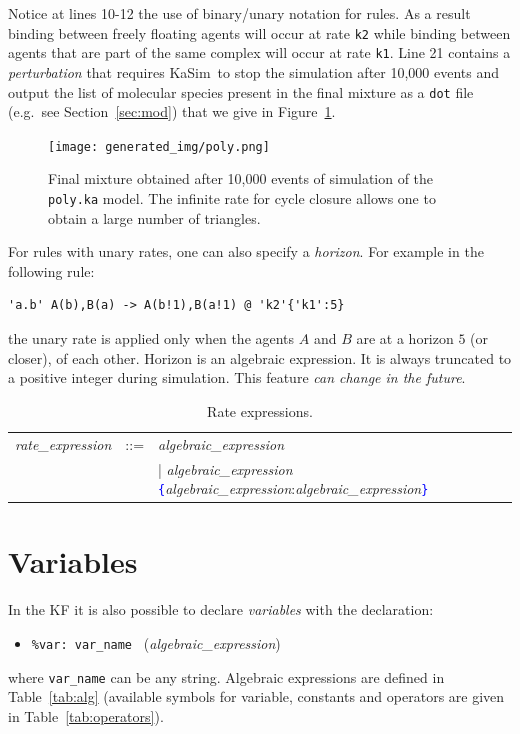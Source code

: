 \documentclass[11pt]{book}
\def\KaSim{\textsf{KaSim}}
\def\tcb#1{\textcolor{blue}{\ttt{#1}}}
\def\ttt#1{\texttt{#1}}
\def\var#1{{\textquotesingle}#1{\textquotesingle}}
\def\eg{e.g.~}
\def\ITE#1{\begin{itemize}#1\end{itemize}}
\begin{document}
Notice at lines 10-12 the use of binary/unary notation for rules. As a
result binding between freely floating agents will occur at rate
\ttt{{\textquotesingle}k2{\textquotesingle}} while binding between
agents that are part of the same complex will occur at rate
\ttt{{\textquotesingle}k1{\textquotesingle}}. Line 21 contains a
\emph{perturbation} that requires \KaSim~to stop the simulation after
10,000 events and output the list of molecular species present in the
final mixture as a \texttt{dot} file ({\eg}see Section~\ref{sec:mod})
that we give in Figure~\ref{fig:species}.

\begin{figure}[htbp]
\begin{center}
\texttt{[image: generated\_img/poly.png]}
\caption{Final mixture %
   obtained after 10,000 events of simulation of the \ttt{poly.ka} model. The infinite rate for cycle closure allows one to obtain a large number of triangles.}
\label{fig:species}
\end{center}
\end{figure}

For rules with unary rates, one can also specify a \emph{horizon}.
For example in the following rule:
\begin{lstlisting}[language=kappa]
'a.b' A(b),B(a) -> A(b!1),B(a!1) @ 'k2'{'k1':5}
\end{lstlisting}
the unary rate is applied only when the agents $A$ and $B$ are at a
horizon $5$ (or closer), of each other. Horizon is an algebraic expression. It is always truncated to a positive integer
during simulation.
This feature \emph{can change in the future}.

\begin{table}[ht!]
  \centering
  \caption{Rate expressions.}
  \begin{tabular}{@{} lcl @{}}
    \textit{rate\_expression} &::=& \textit{algebraic\_expression} \\
&&| \textit{algebraic\_expression} \tcb{\{}\textit{algebraic\_expression}:\textit{algebraic\_expression}\tcb{\}}
    \end{tabular}
  \label{tab:rates}
\end{table}

\section{Variables}\label{sec:var}

In the KF it is also possible to declare \emph{variables} with the declaration:
\ITE{
\item[] \ttt{\%var: \var{var\_name}~} (\textit{algebraic\_expression})
}
where \ttt{var\_name} can be any string. Algebraic expressions are defined in Table~\ref{tab:alg} (available symbols for variable, constants and operators are given in  Table~\ref{tab:operators}).
\end{document}

